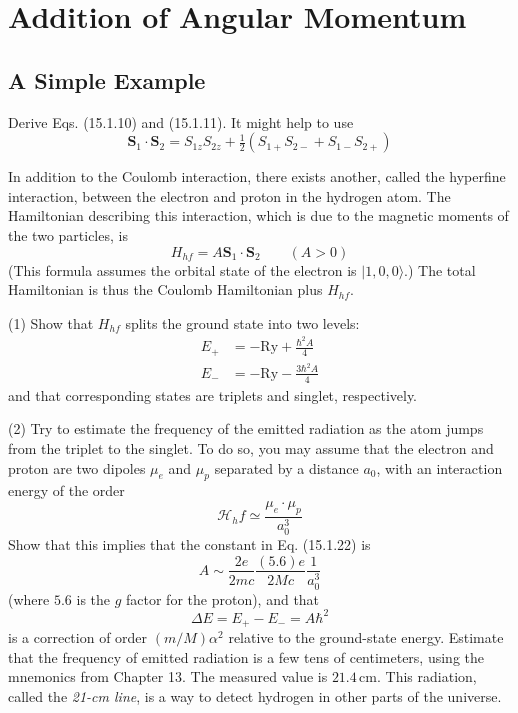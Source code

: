 \documentclass[../principles-of-quantum-mechanics.tex]{subfiles}
\begin{document}
	\printanswers
	
	\section{Addition of Angular Momentum}
	
	\begin{questions}
		\setcounter{subsection}{0}
		\setcounter{question}{0}
		\subsection{A Simple Example}
		\question Derive Eqs. (15.1.10) and (15.1.11). It might help to use
		$$\mathbf{S}_1\cdot\mathbf{S}_2 = S_{1z}S_{2z} + \tfrac{1}{2}(S_{1+}S_{2-} + S_{1-}S_{2+})$$
		
		\question In addition to the Coulomb interaction, there exists another, called the hyperfine interaction, between the electron and proton in the hydrogen atom. The Hamiltonian describing this interaction, which is due to the magnetic moments of the two particles, is
		$$H_{hf} = A\mathbf{S}_1\cdot\mathbf{S}_2\qquad(A > 0)$$
		(This formula assumes the orbital state of the electron is $|1, 0, 0\rangle$.) The total Hamiltonian is thus the Coulomb Hamiltonian plus $H_{hf}$.
		
		(1) Show that $H_{hf}$ splits the ground state into two levels:
		\begin{align*}
			E_+ &= -\mathrm{Ry} + \frac{\hbar^2A}{4} \\
			E_- &= -\mathrm{Ry} - \frac{3\hbar^2A}{4}
		\end{align*}
		and that corresponding states are triplets and singlet, respectively.
		
		(2) Try to estimate the frequency of the emitted radiation as the atom jumps from the triplet to the singlet. To do so, you may assume that the electron and proton are two dipoles $\mu_e$ and $\mu_p$ separated by a distance $a_0$, with an interaction energy of the order
		$$\mathcal{H}_hf \simeq \frac{\mu_e\cdot\mu_p}{a_0^3}$$
		Show that this implies that the constant in Eq. (15.1.22) is
		$$A \sim \frac{2e}{2mc}\frac{(5.6)e}{2Mc}\frac{1}{a_0^3}$$
		(where $5.6$ is the $g$ factor for the proton), and that
		$$\Delta E = E_+ - E_- = A\hbar^2$$
		is a correction of order $(m/M)\alpha^2$ relative to the ground-state energy. Estimate that the frequency of emitted radiation is a few tens of centimeters, using the mnemonics from Chapter 13. The measured value is $21.4\,\text{cm}$. This radiation, called the \textit{21-cm line}, is a way to detect hydrogen in other parts of the universe.
		

\end{questions}
\end{document}
